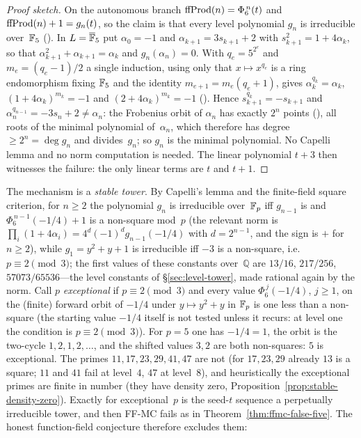 \begin{proof}[Proof sketch]
On the autonomous branch $\mathrm{ffProd}(n) = \Phi_6^{\,n}(t)$ and
$\mathrm{ffProd}(n)+1 = g_n(t)$, so the claim is that every level polynomial
$g_n$ is irreducible over~$\mathbb{F}_5$
().  In
$L = \overline{\mathbb{F}}_5$ put $\alpha_0 = -1$ and
$\alpha_{k+1} = 3s_{k+1}+2$ with $s_{k+1}^2 = 1+4\alpha_k$, so that
$\alpha_{k+1}^2+\alpha_{k+1} = \alpha_k$ and $g_n(\alpha_n) = 0$.  With
$q_e = 5^{2^e}$ and $m_e = (q_e-1)/2$ a single induction, using only
that $x \mapsto x^{q_e}$ is a ring endomorphism fixing $\mathbb{F}_5$ and the
identity $m_{e+1} = m_e(q_e+1)$, gives
$\alpha_k^{q_k} = \alpha_k$, $(1+4\alpha_k)^{m_k} = -1$ and
$(2+4\alpha_k)^{m_k} = -1$
().  Hence
$s_{k+1}^{q_k} = -s_{k+1}$ and $\alpha_n^{q_{n-1}} = -3s_n+2 \neq \alpha_n$:
the Frobenius orbit of $\alpha_n$ has exactly $2^n$ points
(), all
roots of the minimal polynomial of~$\alpha_n$, which therefore has
degree $\geq 2^n = \deg g_n$ and divides~$g_n$; so $g_n$ is the minimal
polynomial.  No Capelli lemma and no norm computation is needed.  The
linear polynomial $t+3$ then witnesses the failure: the only linear
terms are $t$ and $t+1$.
\end{proof}

The mechanism is a \emph{stable tower}.  By Capelli's lemma and the
finite-field square criterion, for $n\ge2$ the polynomial $g_n$ is
irreducible over~$\mathbb{F}_p$ iff $g_{n-1}$ is and $\Phi_6^{\,n-1}(-1/4)+1$ is a
non-square mod~$p$ (the relevant norm is
$\prod_i(1+4\alpha_i)=4^{d}(-1)^{d}g_{n-1}(-1/4)$ with $d=2^{n-1}$, and the
sign is $+$ for $n\ge2$), while $g_1=y^2+y+1$ is irreducible iff $-3$ is a
non-square, i.e.\ $p\equiv2\pmod3$; the
first values of these constants over~$\mathbb{Q}$ are $13/16$, $217/256$,
$57073/65536$---the level constants of \S\ref{sec:level-tower}, made
rational again by the norm.  Call $p$ \emph{exceptional} if $p \equiv 2
\pmod 3$ and every value $\Phi_6^{\,j}(-1/4)$, $j\ge1$, on the (finite)
forward orbit of $-1/4$ under $y \mapsto y^2+y$ in $\mathbb{F}_p$ is one less than
a non-square (the starting value $-1/4$ itself is not tested unless it
recurs: at level one the condition is $p\equiv2\pmod3$).  For $p = 5$
one has $-1/4 = 1$, the orbit is the two-cycle $1,2,1,2,\dots$, and the
shifted values $3, 2$ are both non-squares: $5$ is exceptional.  The
primes $11, 17, 23, 29, 41, 47$ are not (for $17, 23, 29$ already $13$
is a square; $11$ and $41$ fail at level~$4$, $47$ at level~$8$), and
heuristically the exceptional primes are finite in number
(they have density zero, Proposition~\ref{prop:stable-density-zero}).  Exactly for
exceptional~$p$ is the seed-$t$ sequence a perpetually irreducible
tower, and then FF-MC fails as in Theorem~\ref{thm:ffmc-false-five}.
The honest function-field conjecture therefore excludes them:


